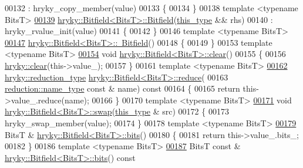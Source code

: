 \begin{DoxyCode}
00132     : hryky\_copy\_member(value)
00133 \{
00134 \}
00138 \textcolor{keyword}{template} <\textcolor{keyword}{typename} BitsT>
\hypertarget{bitfield_8h_source_l00139}{}\hyperlink{classhryky_1_1_bitfield_aa1e9cb12f22dc0038dd8c0775960809b}{00139} \hyperlink{classhryky_1_1_bitfield}{hryky::Bitfield<BitsT>::Bitfield}(\hyperlink{classhryky_1_1_bitfield}{this_type} && rhs)
00140     : hryky\_rvalue\_init(value)
00141 \{
00142 \}
00146 \textcolor{keyword}{template} <\textcolor{keyword}{typename} BitsT>
\hypertarget{bitfield_8h_source_l00147}{}\hyperlink{classhryky_1_1_bitfield_a7b60506d4c34f3c1b341029e2ae3ac29}{00147} \hyperlink{classhryky_1_1_bitfield}{hryky::Bitfield<BitsT>::~Bitfield}()
00148 \{
00149 \}
00153 \textcolor{keyword}{template} <\textcolor{keyword}{typename} BitsT>
\hypertarget{bitfield_8h_source_l00154}{}\hyperlink{classhryky_1_1_bitfield_a0e0528ec842e58a4e5d865c9cda07a46}{00154} \textcolor{keywordtype}{void} \hyperlink{namespacehryky_aa201297ea9530da954a7230be71cc19d}{hryky::Bitfield<BitsT>::clear}()
00155 \{
00156     \hyperlink{namespacehryky_aa201297ea9530da954a7230be71cc19d}{hryky::clear}(this->value\_);
00157 \}
00161 \textcolor{keyword}{template} <\textcolor{keyword}{typename} BitsT>
\hypertarget{bitfield_8h_source_l00162}{}\hyperlink{classhryky_1_1_bitfield_a5cebc48b87ae30dfa43cbcbda5cc9de8}{00162} \hyperlink{classhryky_1_1_intrusive_ptr}{hryky::reduction_type} \hyperlink{namespacehryky_af41cb3af6766761da0ff21b84527a52c}{hryky::Bitfield<BitsT>::reduce}(
00163     \hyperlink{classhryky_1_1reduction_1_1_string}{reduction::name_type} \textcolor{keyword}{const} & name)\textcolor{keyword}{ const}
00164 \textcolor{keyword}{}\{
00165     \textcolor{keywordflow}{return} this->value\_.reduce(name);
00166 \}
00170 \textcolor{keyword}{template} <\textcolor{keyword}{typename} BitsT>
\hypertarget{bitfield_8h_source_l00171}{}\hyperlink{classhryky_1_1_bitfield_a8425c4e2e86ec47dca85a13fdcee5ee0}{00171} \textcolor{keywordtype}{void} \hyperlink{namespacehryky_a4282146df5ea2b68cb667896a2205909}{hryky::Bitfield<BitsT>::swap}(\hyperlink{classhryky_1_1_bitfield}{this_type} & src)
00172 \{
00173     hryky\_swap\_member(value);
00174 \}
00178 \textcolor{keyword}{template} <\textcolor{keyword}{typename} BitsT>
\hypertarget{bitfield_8h_source_l00179}{}\hyperlink{classhryky_1_1_bitfield_a04c5998228b1907cfa497108df297175}{00179} BitsT & \hyperlink{classhryky_1_1_bitfield}{hryky::Bitfield<BitsT>::bits}()
00180 \{
00181     \textcolor{keywordflow}{return} this->value\_.bits\_;
00182 \}
00186 \textcolor{keyword}{template} <\textcolor{keyword}{typename} BitsT>
\hypertarget{bitfield_8h_source_l00187}{}\hyperlink{classhryky_1_1_bitfield_a3a0f981d38a144f6f8332f47e9da5496}{00187} BitsT \textcolor{keyword}{const} & \hyperlink{classhryky_1_1_bitfield}{hryky::Bitfield<BitsT>::bits}()\textcolor{keyword}{ const}

\end{DoxyCode}
